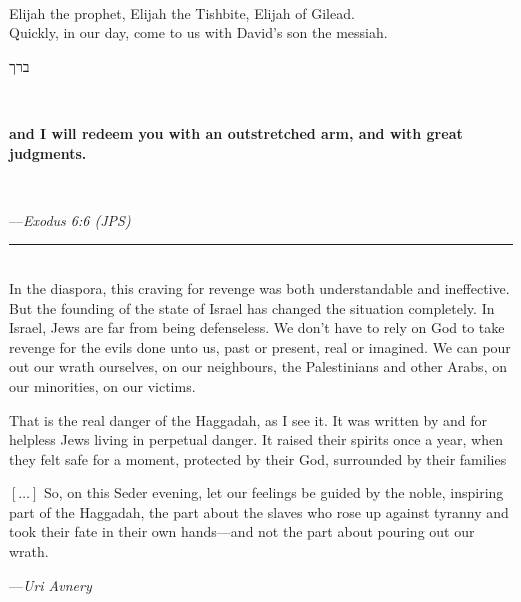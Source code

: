 \documentclass[a4paper,10pt,openany]{memoir}
\newcommand{\HgEllipsis}{\ensuremath{\left[\ldots\right]}}
\newcommand{\HgSource}[1]{\hfill{\small---\itshape{#1}}}
\newcommand{\hchapter}[1]{
  \begin{hebrew}
    \begin{Spacing}{.97}
      \newpage
      \strut

      \vspace{.15em}

      \noindent\Huge #1

      \vspace{1em}
    \end{Spacing}
  \end{hebrew}
}
\newcommand{\HgHL}[1]{{\Large\bfseries#1\par\noindent\\[-.5em]}}
\newcommand{\HgFill}{\vfill \hrule \vfill}
\newenvironment{HgEnglish}{\strut\\\noindent}{\vspace{1em}}
\begin{document}
\begin{HgEnglish}
  Elijah the prophet, Elijah the Tishbite, Elijah of Gilead. \\
  Quickly, in our day, come to us with David's son the messiah.
\end{HgEnglish}

\vfill

\hchapter{ברך \\ {\LARGE \strut}}

\begin{HgEnglish}
  \HgHL{and I will redeem you with an outstretched arm, and with great
  judgments.}

  \vspace{-2em}
  \HgSource{Exodus 6:6 (JPS)}
\end{HgEnglish}

\HgFill

\begin{HgEnglish}
   In the diaspora, this craving for revenge was both understandable and
   ineffective. But the founding of the state of Israel has changed the
   situation completely. In Israel, Jews are far from being defenseless. We
   don’t have to rely on God to take revenge for the evils done unto us, past or
   present, real or imagined. We can pour out our wrath ourselves, on our
   neighbours, the Palestinians and other Arabs, on our minorities, on our
   victims.

   That is the real danger of the Haggadah, as I see it. It was written by and
   for helpless Jews living in perpetual danger. It raised their spirits once a
   year, when they felt safe for a moment, protected by their God, surrounded by
   their families


   \HgEllipsis{} So, on this Seder evening, let our feelings be guided by the
   noble, inspiring part of the Haggadah, the part about the slaves who rose up
   against tyranny and took their fate in their own hands---and not the part
   about pouring out our wrath.

   \HgSource{Uri Avnery}
\end{HgEnglish}
\end{document}
